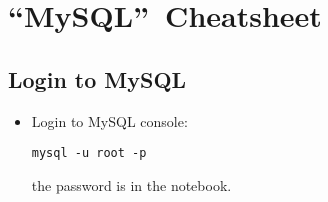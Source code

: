 \section{\textquotedblleft MySQL\textquotedblright\ Cheatsheet}

%

\subsection{Login to MySQL}

\begin{itemize}
    \item Login to MySQL console:
    \begin{verbatim}
mysql -u root -p
    \end{verbatim}
    the password is in the notebook.
\end{itemize}
